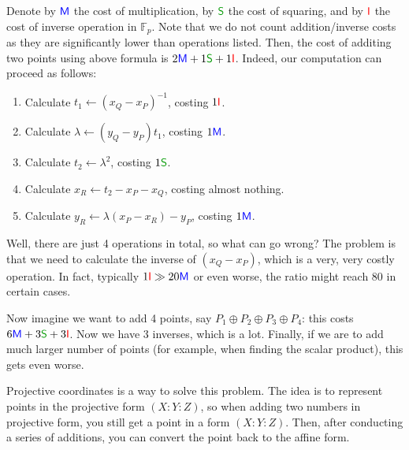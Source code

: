 \documentclass[../lecture-notes.tex]{subfiles}
\begin{document}
Denote by $\textcolor{blue}{\mathsf{M}}$ the cost of multiplication, by $\textcolor{green!60!black}{\mathsf{S}}$ the cost of squaring, and by $\textcolor{red}{\mathsf{I}}$ the cost of inverse operation in $\mathbb{F}_p$. Note that we do not count addition/inverse costs as they are significantly lower than operations listed. Then, the cost of additing two points using above formula is $2\textcolor{blue}{\mathsf{M}} + 1\textcolor{green!60!black}{\mathsf{S}} + 1\textcolor{red}{\mathsf{I}}$. Indeed, our computation can proceed as follows:
\begin{enumerate}
    \item Calculate $t_1 \gets (x_Q-x_P)^{-1}$, costing $1\textcolor{red}{\mathsf{I}}$.
    \item Calculate $\lambda \gets (y_Q-y_P)t_1$, costing $1\textcolor{blue}{\mathsf{M}}$.
    \item Calculate $t_2 \gets \lambda^2$, costing $1\textcolor{green!60!black}{\mathsf{S}}$.
    \item Calculate $x_R \gets t_2 - x_P - x_Q$, costing almost nothing.
    \item Calculate $y_R \gets \lambda (x_P-x_R) - y_P$, costing $1\textcolor{blue}{\mathsf{M}}$.
\end{enumerate}

Well, there are just 4 operations in total, so what can go wrong? The problem is that we need to calculate the inverse of $(x_Q-x_P)$, which is a very, very costly operation. In fact, typically $1\textcolor{red}{\mathsf{I}} \gg 20\textcolor{blue}{\mathsf{M}}$ or even worse, the ratio might reach $80$ in certain cases.

Now imagine we want to add 4 points, say $P_1 \oplus P_2 \oplus P_3 \oplus P_4$: this costs $6\textcolor{blue}{\mathsf{M}} + 3\textcolor{green!60!black}{\mathsf{S}} + 3\textcolor{red}{\mathsf{I}}$. Now we have 3 inverses, which is a lot. Finally, if we are to add much larger number of points (for example, when finding the scalar product), this gets even worse. 

Projective coordinates is a way to solve this problem. The idea is to represent points in the projective form $(X:Y:Z)$, so when adding two numbers in projective form, you still get a point in a form $(X:Y:Z)$. Then, after conducting a series of additions, you can convert the point back to the affine form. 
\end{document}
